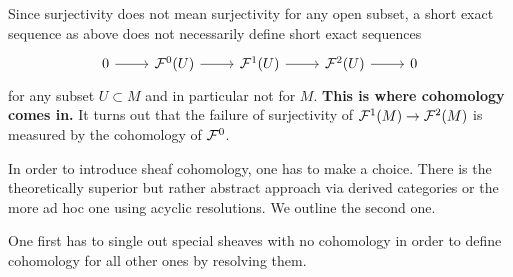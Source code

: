 \begin{remark}
	Since surjectivity does not mean surjectivity for any open subset, a short exact sequence as above does not necessarily define short exact sequences
	\[ \begin{tikzcd}
		0\arrow[r]&\Fc^0(U)\arrow[r]&\Fc^1(U)\arrow[r]&\Fc^2(U)\arrow[r]&0
	\end{tikzcd}\]
	for any subset $U\subset M$ and in particular not for $M$. \textbf{This is where cohomology comes in.} It turns out that the failure of surjectivity of $\mathcal{F}^1(M)\to\mathcal{F}^2(M)$ is measured by the cohomology of $\mathcal{F}^0$.
\end{remark}

In order to introduce sheaf cohomology, one has to make a choice. There is the theoretically superior but rather abstract approach via derived categories or the more ad hoc one using acyclic resolutions. We outline the second one.

One first has to single out special sheaves with no cohomology in order to define cohomology for all other ones by resolving them.

